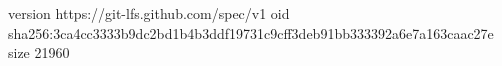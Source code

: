 version https://git-lfs.github.com/spec/v1
oid sha256:3ca4cc3333b9dc2bd1b4b3ddf19731c9cff3deb91bb333392a6e7a163caac27e
size 21960

